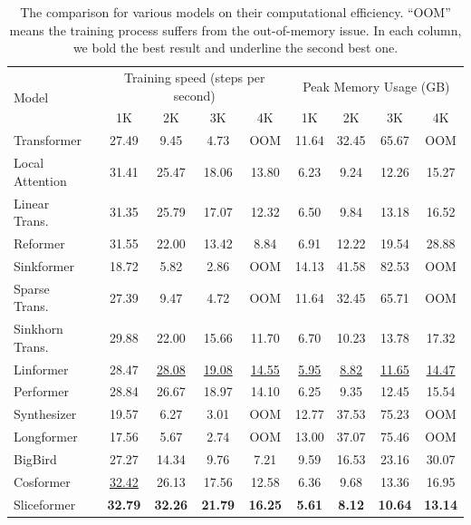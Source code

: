 \begin{table}[t]
  \centering
  \caption{The comparison for various models on their computational efficiency. 
  ``OOM'' means the training process suffers from the out-of-memory issue.
  In each column, we bold the best result and underline the second best one.}
  \small{
    \begin{tabular}{l|cccc|cccc}
    \toprule
    \multirow{2}{*}{Model}  & \multicolumn{4}{c|}{Training speed (steps per second)}  & \multicolumn{4}{c}{Peak Memory Usage (GB)} \\
     & 1K    & 2K    & 3K    & 4K    &  1K    & 2K    & 3K    & 4K \\
    \midrule
    Transformer~\cite{vaswani2017attention} & 27.49 & 9.45  & 4.73  & OOM & 11.64 & 32.45 & 65.67 &  OOM \\
    \midrule
    Local Attention~\cite{tay2021long} & 31.41 & 25.47 & 18.06 & 13.80 &  6.23  & 9.24  & 12.26 & 15.27 \\
    Linear Trans.~\cite{katharopoulos2020transformers} & 31.35 & 25.79 & 17.07 & 12.32 & 6.50  & 9.84  & 13.18 & 16.52 \\
    Reformer~\cite{kitaev2020reformer} & 31.55 & 22.00 & 13.42 & 8.84  &  6.91  & 12.22 & 19.54 & 28.88 \\
    Sinkformer~\cite{sander2022sinkformers} & 18.72 & 5.82  & 2.86  & OOM  & 14.13 & 41.58 & 82.53 & OOM \\
    Sparse Trans.~\cite{child2019generating} & 27.39 & 9.47  & 4.72  & OOM & 11.64 & 32.45 & 65.71 & OOM \\
    Sinkhorn Trans.~\cite{tay2020sparse} & 29.88 & 22.00 & 15.66 & 11.70 &  6.70  & 10.23 & 13.78 & 17.32 \\
    Linformer~\cite{wang2020linformer} & 28.47 & \underline{28.08} & \underline{19.08} & \underline{14.55} &  \underline{5.95}  & \underline{8.82}  & \underline{11.65} & \underline{14.47} \\
    Performer~\cite{choromanski2021rethinking} & 28.84 & 26.67 & 18.97 & 14.10 & 6.25  & 9.35  & 12.45 & 15.54 \\
    Synthesizer~\cite{tay2021synthesizer} & 19.57 & 6.27  & 3.01  & OOM &  12.77 & 37.53 & 75.23 & OOM  \\
    Longformer~\cite{beltagy2020longformer} & 17.56 & 5.67  & 2.74  &  OOM & 13.00 & 37.07 & 75.46 & OOM\\
    BigBird~\cite{zaheer2020big} & 27.27 & 14.34 & 9.76  & 7.21  & 9.59  & 16.53 & 23.16 & 30.07 \\    
    Cosformer~\cite{zhen2022cosformer} & \underline{32.42} & 26.13 & 17.56 & 12.58 & 6.36 & 9.68 & 13.36 & 16.95 \\
    \midrule
    Sliceformer & \textbf{32.79} & \textbf{32.26} & \textbf{21.79} & \textbf{16.25}  & \textbf{5.61}  & \textbf{8.12}  & \textbf{10.64} & \textbf{13.14} \\
    \bottomrule
    \end{tabular}%
    }
  \label{tab:lra_effi}%
\end{table}%


